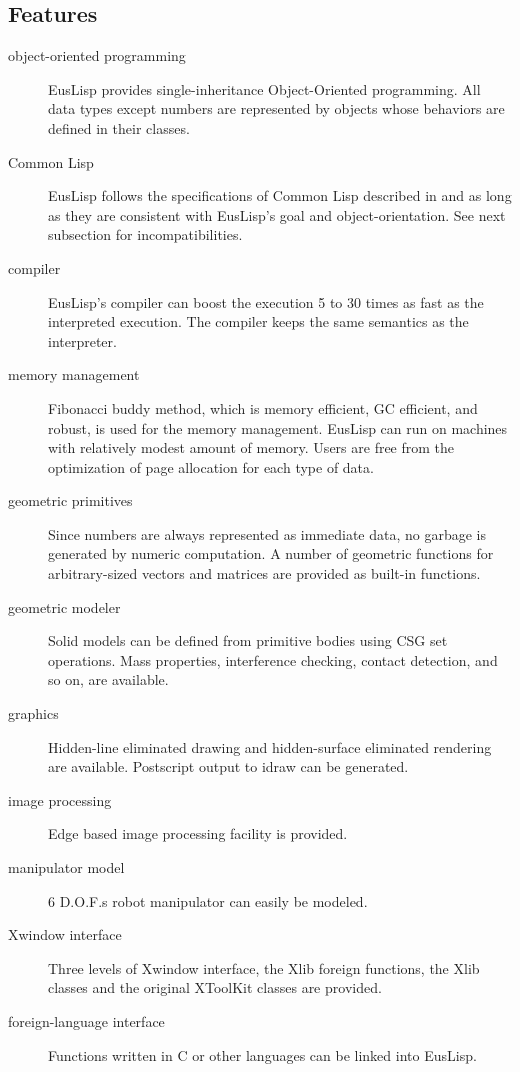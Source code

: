 \subsection{Features}

\begin{description}
\item [object-oriented programming]
EusLisp provides single-inheritance Object-Oriented programming.
All data types except numbers are represented by objects whose
behaviors are defined in their classes.
\item [Common Lisp] EusLisp follows the specifications of Common Lisp
described in \cite{CLtL} and \cite{CLtL2}
as long as they are consistent with EusLisp's goal and object-orientation.
See next subsection for incompatibilities.
\item [compiler]
EusLisp's compiler can boost the execution  5 to 30 
times as fast as the interpreted execution.
The compiler keeps the same semantics as the interpreter.
\item[memory management] Fibonacci buddy method,
which is memory efficient, GC efficient, and robust,
is used for the memory management.
EusLisp can run on machines with relatively modest amount of memory.
Users are free from the optimization of page allocation for each
type of data.
\item [geometric primitives]
Since numbers are always represented as immediate data,
no garbage is generated by numeric computation.
A number of geometric functions for arbitrary-sized  vectors and matrices
are provided as built-in functions.
\item [geometric modeler]
Solid models can be defined from primitive bodies using CSG set operations.
Mass properties, interference checking, contact detection, and so on,
are available.
\item [graphics]
Hidden-line eliminated drawing and hidden-surface eliminated rendering
are available.
Postscript output to idraw can be generated.
\item [image processing]
Edge based image processing facility is provided.
\item [manipulator model]
6 D.O.F.s robot manipulator can easily be modeled.
\item [Xwindow interface]
Three levels of Xwindow interface, the Xlib foreign functions, 
the Xlib classes and the original XToolKit classes are provided.
\item [foreign-language interface]
Functions written in C or other languages can be linked into EusLisp.

\end{description}
